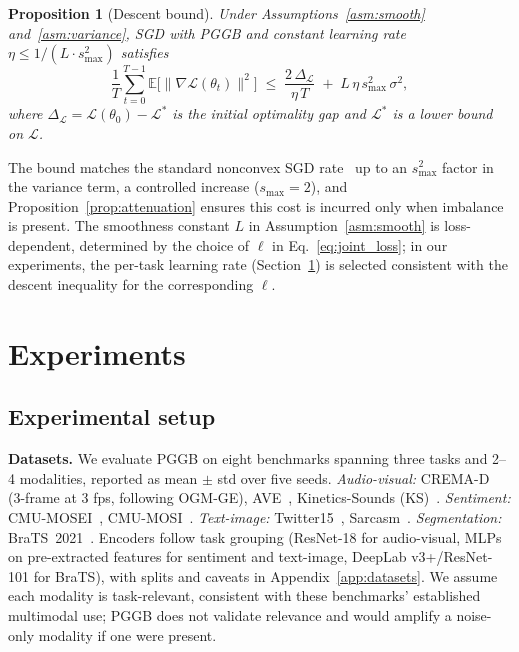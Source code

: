 \documentclass{article} %
\newtheorem{proposition}{Proposition}
\newcommand{\loss}{\mathcal{L}}
\begin{document}
\begin{proposition}[Descent bound]
\label{prop:convergence}
Under Assumptions~\ref{asm:smooth} and~\ref{asm:variance}, SGD with PGGB and constant learning rate $\eta \leq 1/(L \cdot s_{\max}^2)$ satisfies
%
\begin{equation}
\label{eq:convergence}
\frac{1}{T}\sum_{t=0}^{T-1} \mathbb{E}\bigl[\|\nabla \loss(\theta_t)\|^2\bigr]
\;\leq\; \frac{2\,\Delta_{\loss}}{\eta\, T} \;+\; L\,\eta\, s_{\max}^2\, \sigma^2,
\end{equation}
%
where $\Delta_{\loss} = \loss(\theta_0) - \loss^{*}$ is the initial optimality gap and $\loss^{*}$ is a lower bound on $\loss$.
\end{proposition}

The bound matches the standard nonconvex SGD rate~\citep{ghadimi2013sgd} up to an $s_{\max}^2$ factor in the variance term, a controlled increase ($s_{\max}=2$), and Proposition~\ref{prop:attenuation} ensures this cost is incurred only when imbalance is present. The smoothness constant $L$ in Assumption~\ref{asm:smooth} is loss-dependent, determined by the choice of $\ell$ in Eq.~\eqref{eq:joint_loss}; in our experiments, the per-task learning rate (Section~\ref{sec:experiments}) is selected consistent with the descent inequality for the corresponding $\ell$.


\section{Experiments}
\label{sec:experiments}
\vspace{-1.2em}

\subsection{Experimental setup}
\label{sec:datasets}

\textbf{Datasets.}
We evaluate PGGB on eight benchmarks spanning three tasks and 2--4 modalities, reported as mean $\pm$ std over five seeds. \emph{Audio-visual:} CREMA-D~\citep{cao2014cremad} (3-frame at 3 fps, following OGM-GE), AVE~\citep{tian2018ave}, Kinetics-Sounds (KS)~\citep{arandjelovic2017kinetics}. \emph{Sentiment:} CMU-MOSEI~\citep{zadeh2018mosei}, CMU-MOSI~\citep{zadeh2016mosi}. \emph{Text-image:} Twitter15~\citep{yu2019tombert, zhang2018adaptive}, Sarcasm~\citep{cai2019sarcasm}. \emph{Segmentation:} BraTS~2021~\citep{baid2021brats}. Encoders follow task grouping (ResNet-18 for audio-visual, MLPs on pre-extracted features for sentiment and text-image, DeepLab v3+/ResNet-101 for BraTS), with splits and caveats in Appendix~\ref{app:datasets}. We assume each modality is task-relevant, consistent with these benchmarks' established multimodal use; PGGB does not validate relevance and would amplify a noise-only modality if one were present.
\end{document}

